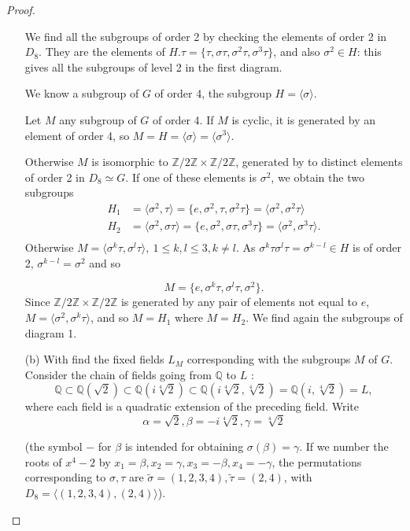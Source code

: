 \documentclass[11pt,a4paper]{article}
\newcommand{\Q}{\mathbb{Q}}
\newcommand{\Z}{\mathbb{Z}}
\begin{document}
\begin{proof}
\begin{enumerate}
We find all the subgroups of order 2 by checking the elements of order 2 in $D_8$. They are the elements of $H.\tau = \{\tau, \sigma \tau, \sigma^2 \tau, \sigma^3 \tau\}$, and also $\sigma^2 \in H$: this gives all the subgroups of level 2 in the first diagram.

We know a subgroup of $G$ of order 4,  the subgroup $H = \langle \sigma \rangle$.

Let $M$ any subgroup of $G$ of order 4. If $M$ is cyclic, it is generated by an element of order 4, so $M = H = \langle \sigma \rangle = \langle \sigma^3 \rangle$.

Otherwise $M$ is isomorphic to $\Z/2\Z \times \Z/2\Z$, generated by to distinct elements of order 2 in $D_8 \simeq G$.
If one of these elements is $\sigma^2$, we obtain the two subgroups
\begin{align*}
H_1 &= \langle \sigma^2, \tau\rangle =\{e, \sigma^2,\tau,\sigma^2\tau\} = \langle \sigma^2, \sigma^2 \tau\rangle\\
H_2 &= \langle \sigma^2, \sigma \tau\rangle =\{e, \sigma^2,\sigma \tau,\sigma^3\tau\}= \langle \sigma^2, \sigma^3 \tau\rangle.\\
\end{align*}
Otherwise $M = \langle \sigma^k \tau ,\sigma^l \tau\rangle,\ 1\leq k,l \leq 3,k\neq l$. As $\sigma^k\tau \sigma^l \tau = \sigma^{k-l} \in H$ is of order 2, $\sigma^{k-l} = \sigma^2$ and so 

$$M = \{e, \sigma^k \tau, \sigma^l \tau, \sigma^{2} \}.$$
Since $\Z/2\Z \times \Z/2\Z$ is generated by any pair of elements not equal to $e$, $M = \langle \sigma^2, \sigma^k \tau\rangle$, and so $M = H_1$ where $M = H_2$. We find again the subgroups of diagram 1.

\item[(b)]
With find the fixed fields $L_M$ corresponding with the subgroups  $M$ of $G$.
Consider the chain of fields going from $\Q$ to $L$ : 
$$\Q\subset \Q(\sqrt{2}) \subset \Q(i\sqrt[4]{2}) \subset \Q(i\sqrt[4]{2}, \sqrt[4]{2})= \Q(i,\sqrt[4]{2}) = L,$$
where each field is a quadratic extension of the preceding field. Write $$\alpha = \sqrt{2}, \beta = -i\sqrt[4]{2}, \gamma =\sqrt[4]{2}$$

(the symbol $-$ for $\beta$ is intended for obtaining $\sigma(\beta) = \gamma$. If we number the roots of $x^4-2$ by $x_1 = \beta, x_2 = \gamma, x_3 = -\beta, x_4 = -\gamma$, the permutations corresponding to $\sigma, \tau$ are $\tilde{\sigma} = (1,2,3,4), \tilde{\tau} = (2,4)$, with $D_8 = \langle(1,2,3,4),(2,4)\rangle$).


\end{enumerate}
\end{proof}
\end{document}

